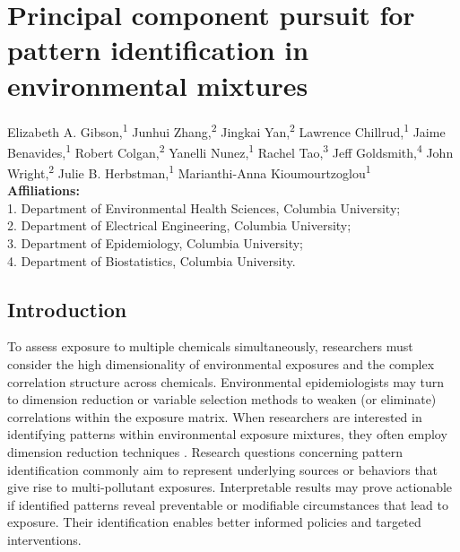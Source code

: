 \chapter[Principal component pursuit]{Principal component pursuit for pattern identification in environmental mixtures}\label{sec:ch2}
\vspace{-3em}

\begin{center}
Elizabeth A. Gibson,\textsuperscript{1} 
Junhui Zhang,\textsuperscript{2} 
Jingkai Yan,\textsuperscript{2}
Lawrence Chillrud,\textsuperscript{1} 
Jaime Benavides,\textsuperscript{1} 
Robert Colgan,\textsuperscript{2} 
Yanelli Nunez,\textsuperscript{1} 
Rachel Tao,\textsuperscript{3} 
Jeff Goldsmith,\textsuperscript{4} 
John Wright,\textsuperscript{2} 
Julie B. Herbstman,\textsuperscript{1} 
Marianthi-Anna Kioumourtzoglou\textsuperscript{1} \\ 

\textbf{Affiliations:} \\ 
1. Department of Environmental Health Sciences, Columbia University; \\ 
2. Department of Electrical Engineering, Columbia University; \\ 
3. Department of Epidemiology, Columbia University; \\
4. Department of Biostatistics, Columbia University. \\ 
\end{center}

\clearpage

\section{Introduction}

To assess exposure to multiple chemicals simultaneously, researchers must consider the high dimensionality of environmental exposures and the complex correlation structure across chemicals. Environmental epidemiologists may turn to dimension reduction or variable selection methods to weaken (or eliminate) correlations within the exposure matrix. When researchers are interested in identifying patterns within environmental exposure mixtures, they often employ dimension reduction techniques \citep{gibson2019complex}. Research questions concerning pattern identification commonly aim to represent underlying sources or behaviors that give rise to multi-pollutant exposures. Interpretable results may prove actionable if identified patterns reveal preventable or modifiable circumstances that lead to exposure. Their identification enables better informed policies and targeted interventions.

